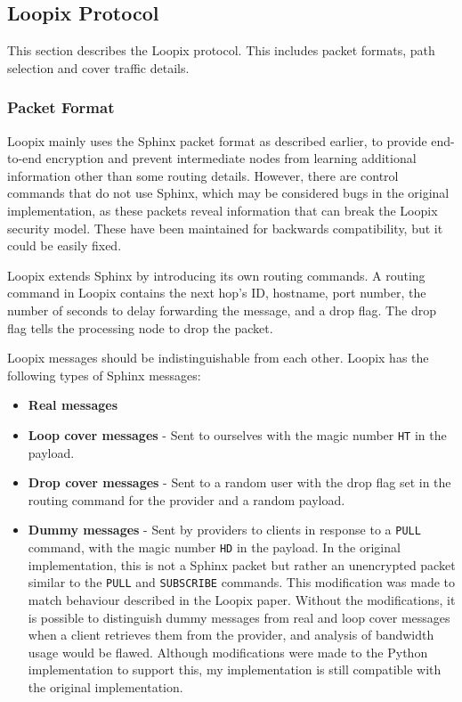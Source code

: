 \documentclass[final,dissertation.tex]{subfiles}
\begin{document}
%

\subsection{Loopix Protocol}

This section describes the Loopix protocol. This includes packet formats, path selection and cover traffic details.

\subsubsection{Packet Format}

Loopix mainly uses the Sphinx packet format as described earlier, to provide end-to-end encryption and prevent intermediate nodes from learning additional information other than some routing details. However, there are control commands that do not use Sphinx, which may be considered bugs in the original implementation, as these packets reveal information that can break the Loopix security model. These have been maintained for backwards compatibility, but it could be easily fixed.

Loopix extends Sphinx by introducing its own routing commands. A routing command in Loopix contains the next hop's ID, hostname, port number, the number of seconds to delay forwarding the message, and a drop flag. The drop flag tells the processing node to drop the packet.

Loopix messages should be indistinguishable from each other. Loopix has the following types of Sphinx messages: 

\begin{itemize}
	\item \textbf{Real messages}
	\item \textbf{Loop cover messages} - Sent to ourselves with the magic number \verb|HT| in the payload.
	\item \textbf{Drop cover messages} - Sent to a random user with the drop flag set in the routing command for the provider and a random payload.
	\item \textbf{Dummy messages} - Sent by providers to clients in response to a \verb|PULL| command, with the magic number \verb|HD| in the payload. In the original implementation, this is not a Sphinx packet but rather an unencrypted packet similar to the \verb|PULL| and \verb|SUBSCRIBE| commands. This modification was made to match behaviour described in the Loopix paper. Without the modifications, it is possible to distinguish dummy messages from real and loop cover messages when a client retrieves them from the provider, and analysis of bandwidth usage would be flawed. Although modifications were made to the Python implementation to support this, my implementation is still compatible with the original implementation.
\end{itemize}
\end{document}
